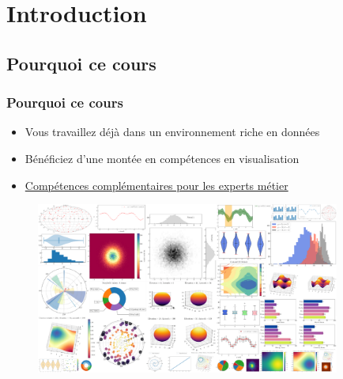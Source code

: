 

\newlength\myheight
\newlength\mydepth
\settototalheight{}
\settodepth{}
\setlength\fboxsep{0pt}
\newcommand*\inlinegraphics[1]{%
  \settototalheight\myheight{Xygp}%
  \settodepth\mydepth{Xygp}%
  \raisebox{-\mydepth}{\texttt{[image: \#1]}}%
}




\begin{frame}
   \titlepage
\end{frame}



\section{Introduction}


\subsection{Pourquoi ce cours}
\begin{frame}\frametitle{Pourquoi ce cours}
   \begin{itemize}
      \item Vous travaillez déjà dans un environnement riche en données
      \item Bénéficiez d'une montée en compétences en visualisation  \inlinegraphics{images/illustrations/up_arrow_green.png}
      \item \href{https://www.forbes.fr/business/les-citizen-data-scientists-donner-des-competences-techniques-aux-experts-metier/}{Compétences complémentaires pour les experts métier}
   \end{itemize}
   \begin{figure}[H]
      \includegraphics[width=10cm]{images/illustrations/viz_cheat_sheet.png}
   \end{figure}
\end{frame}


